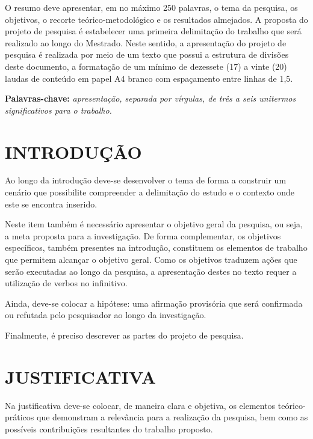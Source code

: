 \documentclass[12pt,a4paper]{article}
\begin{document}
O resumo deve apresentar, em no máximo 250 palavras, o tema da pesquisa, os objetivos, o recorte teórico-metodológico e os resultados almejados. A proposta do projeto de pesquisa é estabelecer uma primeira delimitação do trabalho que será realizado ao longo do Mestrado. Neste sentido, a apresentação do projeto de pesquisa é realizada por meio de um texto que possui a estrutura de divisões deste documento, a formatação de um mínimo de dezessete (17) a vinte (20) laudas de conteúdo em papel A4 branco com espaçamento entre linhas de 1,5.
\\[0.5cm]
\begin{flushleft}
{\bf Palavras-chave:} {\it apresentação, separada por vírgulas, de três a seis unitermos significativos para o trabalho.}
\end{flushleft}

\newpage
\thispagestyle{empty}
\tableofcontents

\newpage
\pagestyle{plain}
\renewcommand{\baselinestretch}{1.5}
\normalsize
\section{INTRODUÇÃO}
Ao longo da introdução deve-se desenvolver o tema de forma a construir um cenário que possibilite compreender a delimitação do estudo e o contexto onde este se encontra inserido.

Neste item também é necessário apresentar o objetivo geral da pesquisa, ou seja, a meta proposta para a investigação. De forma complementar, os objetivos específicos, também presentes na introdução, constituem os elementos de trabalho que permitem alcançar o objetivo geral. Como os objetivos traduzem ações que serão executadas ao longo da pesquisa, a apresentação destes no texto requer a utilização de verbos no infinitivo.

Ainda, deve-se colocar a hipótese: uma afirmação provisória que será confirmada ou refutada pelo pesquisador ao longo da investigação.

Finalmente, é preciso descrever as partes do projeto de pesquisa.

\section{JUSTIFICATIVA}
Na justificativa deve-se colocar, de maneira clara e objetiva, os elementos teórico-práticos que demonstram a relevância para a realização da pesquisa, bem como as possíveis contribuições resultantes do trabalho proposto.
\end{document}
